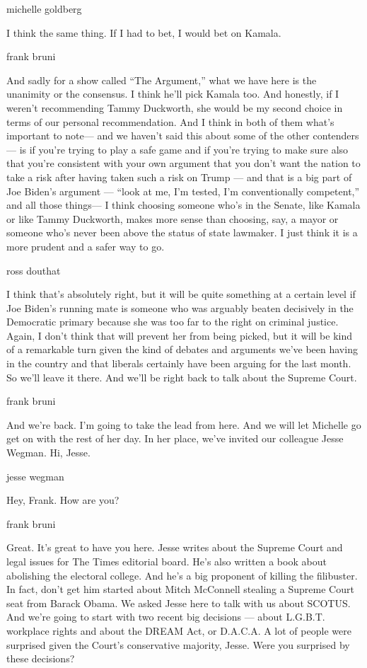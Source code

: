 michelle goldberg

I think the same thing. If I had to bet, I would bet on Kamala.

frank bruni

And sadly for a show called ``The Argument,'' what we have here is the
unanimity or the consensus. I think he'll pick Kamala too. And honestly,
if I weren't recommending Tammy Duckworth, she would be my second choice
in terms of our personal recommendation. And I think in both of them
what's important to note--- and we haven't said this about some of the
other contenders --- is if you're trying to play a safe game and if
you're trying to make sure also that you're consistent with your own
argument that you don't want the nation to take a risk after having
taken such a risk on Trump --- and that is a big part of Joe Biden's
argument --- ``look at me, I'm tested, I'm conventionally competent,''
and all those things--- I think choosing someone who's in the Senate,
like Kamala or like Tammy Duckworth, makes more sense than choosing,
say, a mayor or someone who's never been above the status of state
lawmaker. I just think it is a more prudent and a safer way to go.

ross douthat

I think that's absolutely right, but it will be quite something at a
certain level if Joe Biden's running mate is someone who was arguably
beaten decisively in the Democratic primary because she was too far to
the right on criminal justice. Again, I don't think that will prevent
her from being picked, but it will be kind of a remarkable turn given
the kind of debates and arguments we've been having in the country and
that liberals certainly have been arguing for the last month. So we'll
leave it there. And we'll be right back to talk about the Supreme Court.

frank bruni

And we're back. I'm going to take the lead from here. And we will let
Michelle go get on with the rest of her day. In her place, we've invited
our colleague Jesse Wegman. Hi, Jesse.

jesse wegman

Hey, Frank. How are you?

frank bruni

Great. It's great to have you here. Jesse writes about the Supreme Court
and legal issues for The Times editorial board. He's also written a book
about abolishing the electoral college. And he's a big proponent of
killing the filibuster. In fact, don't get him started about Mitch
McConnell stealing a Supreme Court seat from Barack Obama. We asked
Jesse here to talk with us about SCOTUS. And we're going to start with
two recent big decisions --- about L.G.B.T. workplace rights and about
the DREAM Act, or D.A.C.A. A lot of people were surprised given the
Court's conservative majority, Jesse. Were you surprised by these
decisions?

